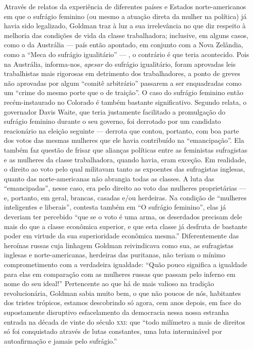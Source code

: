 Através de relatos da experiência de diferentes países e Estados
norte-americanos em que o sufrágio feminino (ou mesmo a atuação direta
da mulher na política) já havia sido legalizado, Goldman traz à luz a
sua irrelevância no que diz respeito à melhoria das condições de vida da
classe trabalhadora; inclusive, em alguns casos, como o da Austrália ---
país então apontado, em conjunto com a Nova Zelândia, como a ``Meca do
sufrágio igualitário'' --- , o contrário é que teria acontecido. Pois na
Austrália, informa-nos, \emph{apesar} do sufrágio igualitário, foram
aprovadas leis trabalhistas mais rigorosas em detrimento dos
trabalhadores, a ponto de greves não aprovadas por algum ``comitê
arbitrário'' passarem a ser enquadradas como um ``crime do mesmo porte
que o de traição''. O caso do sufrágio feminino então recém-instaurado
no Colorado é também bastante significativo. Segundo relata, o
governador Davis Waite, que teria justamente facilitado a promulgação do
sufrágio feminino durante o seu governo, foi derrotado por um candidato
reacionário na eleição seguinte --- derrota que contou, portanto, com boa
parte dos votos das mesmas mulheres que ele havia contribuído na
``emancipação''. Ela também faz questão de frisar que alianças políticas
entre as feministas sufragistas e as mulheres da classe trabalhadora,
quando havia, eram exceção. Em realidade, o direito ao voto pelo qual
militavam tanto as expoentes das sufragistas inglesas, quanto das
norte-americanas não abrangia todas as classes. A luta das
``emancipadas'', nesse caso, era pelo direito ao voto das mulheres
proprietárias --- e, portanto, em geral, brancas, casadas e/ou herdeiras.
Na condição de ``mulheres inteligentes e liberais'', contesta também em
``O sufrágio feminino'', elas já deveriam ter percebido ``que se o voto
é uma arma, os deserdados precisam dele mais do que a classe econômica
superior, e que esta classe já desfruta de bastante poder em virtude da
sua superioridade econômica mesma.'' Diferentemente das heroínas russas
cuja linhagem Goldman reivindicava como sua, as sufragistas inglesas e
norte-americanas, herdeiras das puritanas, não teriam o mínimo
comprometimento com a verdadeira igualdade: ``Quão pouco significa a
igualdade para elas em comparação com as mulheres russas que passam pelo
inferno em nome do seu ideal!'' Pertencente ao que há de mais valioso na
tradição revolucionária, Goldman sabia muito bem, o que não poucos de
nós, habitantes dos tristes trópicos, estamos descobrindo só agora, cem
anos depois, em face do supostamente disruptivo esfacelamento da
democracia nessa nossa estranha entrada na década de vinte do século
\textsc{xxi}: que ``todo milímetro a mais de direitos só foi conquistado através
de lutas constantes, uma luta interminável por autoafirmação e jamais
pelo sufrágio.''

